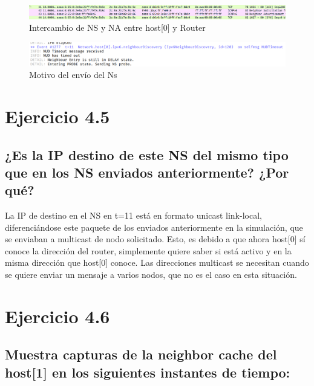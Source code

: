 \begin{figure}[H]
    \centering
    \includegraphics[width=135mm, scale=0.75]{imaxes/ejercicio4_4_1.png}
    \caption{Intercambio de NS y NA entre host[0] y Router}
    \label{fig:postNShost0}
\end{figure}

\begin{figure}[H]
    \centering
    \includegraphics[width=135mm, scale=0.75]{imaxes/ejercicio4_4_2.png}
    \caption{Motivo del envío del Ns}
    \label{fig:NS_purpose}
\end{figure}

\section{Ejercicio 4.5}
\subsection{¿Es la IP destino de este NS del mismo tipo que en los NS enviados anteriormente? ¿Por qué?}

La IP de destino en el NS en t=11 está en formato unicast link-local, diferenciándose este paquete de los enviados anteriormente en la simulación, que se enviaban a multicast de nodo solicitado. Esto, es debido a que ahora host[0] sí conoce la dirección del router, simplemente quiere saber si está activo y en la misma dirección que host[0] conoce. Las direcciones multicast se necesitan cuando se quiere enviar un mensaje a varios nodos, que no es el caso en esta situación.


\section{Ejercicio 4.6}
\subsection{Muestra capturas de la neighbor cache del host[1] en los siguientes instantes de tiempo:}

